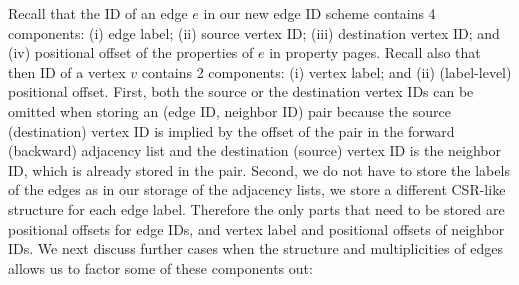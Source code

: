 Recall that the ID of an edge $e$ in our new edge ID scheme contains 4 components: (i) edge label; (ii) source vertex ID; (iii) destination vertex ID; and (iv) positional offset of the properties of $e$ in property pages. Recall also that then ID of a vertex $v$ contains 2 components: (i) vertex label; and (ii) (label-level) positional offset. First, both the source or the destination vertex IDs can be omitted when storing an (edge ID, neighbor ID) pair because the source (destination) vertex ID is implied by the offset of the pair in the forward (backward) adjacency list and the destination (source) vertex ID is the neighbor ID, which is already stored in the pair. Second, we do not have to store the labels of the edges as in our storage of the adjacency lists, we store a different CSR-like structure for each edge label. Therefore the only parts that need to be stored are positional offsets for edge IDs, and vertex label and positional offsets of neighbor IDs. We next discuss further cases when the structure and multiplicities of edges allows us to factor some of these components out: 


